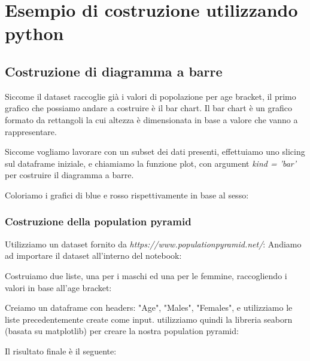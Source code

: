 \documentclass[11pt, oneside]{article}   	%
\begin{document}
\section{Esempio di costruzione utilizzando python}

\subsection{Costruzione di diagramma a barre}
Siccome il dataset raccoglie già i valori di popolazione per age bracket, il primo grafico che possiamo andare a costruire è il bar chart. Il bar chart è un grafico formato da rettangoli la cui altezza è dimensionata in base a valore che vanno a rappresentare. 

Siccome vogliamo lavorare con un subset dei dati presenti, effettuiamo uno slicing sul dataframe iniziale, e chiamiamo la funzione plot, con argument \emph{kind = 'bar'} per costruire il diagramma a barre.
\begin{center}
\end{center}
Coloriamo i grafici di blue e rosso rispettivamente in base al sesso:
\begin{center}
\end{center}

\subsubsection{Costruzione della population pyramid}
Utilizziamo un dataset fornito da \emph{https://www.populationpyramid.net/}:
Andiamo ad importare il dataset all'interno del notebook:
\begin{center}
\end{center}
Costruiamo due liste, una per i maschi ed una per le femmine, raccogliendo i valori in base all'age bracket:
\begin{center}
\end{center}
Creiamo un dataframe con headers: "Age", "Males", "Females", e utilizziamo le liste precedentemente create come input. utilizziamo quindi la libreria seaborn (basata su matplotlib) per creare la nostra population pyramid:
\begin{center}
\end{center}
Il risultato finale è il seguente:
\begin{center}
\end{center}
\end{document}
